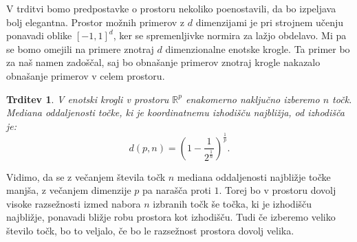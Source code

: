 \documentclass[12pt,a4paper]{article}
\newtheorem{trditev}{Trditev}
\begin{document}
V trditvi bomo predpostavke o prostoru nekoliko poenostavili, da bo izpeljava bolj elegantna. 
Prostor možnih primerov z $d$ dimenzijami je pri strojnem učenju ponavadi oblike $[-1, 1]^d$, ker se spremenljivke normira za lažjo obdelavo. 
Mi pa se bomo omejili na primere znotraj $d$ dimenzionalne enotske krogle. 
Ta primer bo za naš namen zadoščal, saj bo obnašanje primerov znotraj krogle nakazalo obnašanje primerov v celem prostoru.

\begin{trditev}
V enotski krogli v prostoru $\mathbb{R}^p$ enakomerno naključno izberemo $n$ točk. Mediana oddaljenosti točke, ki je koordinatnemu izhodišču najbližja, od izhodišča je:
\[
d(p, n)  = (1 - \frac{1}{2^{\frac{1}{n}}})^{\frac{1}{p}}.
\]
\end{trditev}

Vidimo, da se z večanjem števila točk $n$ mediana oddaljenosti najbližje točke manjša, z večanjem dimenzije $p$ pa narašča proti $1$. 
Torej bo v prostoru dovolj visoke razsežnosti izmed nabora $n$ izbranih točk še točka, ki je izhodišču najbližje, ponavadi bližje robu prostora kot izhodišču. 
Tudi če izberemo veliko število točk, bo to veljalo, če bo le razsežnost prostora dovolj velika.
\end{document}
